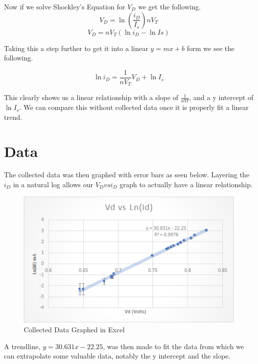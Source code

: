 \documentclass[prb,preprint]{revtex4-1}
\begin{document}
Now if we solve Shockley's Equation for $V_{D}$ we get the following.
\begin{equation}
V_{D}=\ln{(\frac{i_{D}}{I_{s}})nV_{T}}
\end{equation}
\begin{equation}
V_{D}=nV_{T}(\ln{i_{D}}-\ln{Is})
\end{equation}

Taking this a step further to get it into a linear $y=mx+b$ form we see the following.

\begin{equation}
\ln{i_{D}}=\frac{1}{nV_{T}}V_{D}+\ln{I_{s}}
\end{equation}

This clearly shows us a linear relationship with a slope of $\frac{1}{nVt}$, and a y intercept of $\ln{I_{s}}$. We can compare this without collected data once it is properly fit a linear trend.

\section{Data}

The collected data was then graphed with error bars as seen below. Layering the $i_{D}$ in a natural log allows our $V_{D} vs i_{D}$ graph to actually have a linear relationship.

\begin{figure}[ht]
\centering
\includegraphics[width=6in]{vdlnid.png}
\caption{Collected Data Graphed in Excel}
\label{fig1}
\end{figure}

A trendline, $y=30.631x-22.25$, was then made to fit the data from which we can extrapolate some valuable data, notably the y intercept and the slope.
\end{document}
